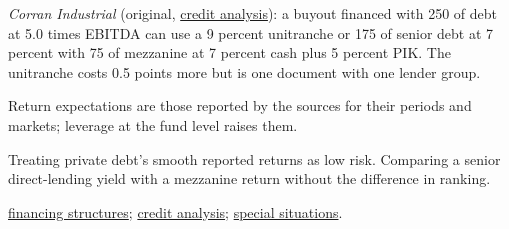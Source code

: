 \begin{qfdefinition}
 \emph{Corran Industrial} (original, \hyperref[meth:private-debt-credit-analysis]{credit analysis}): a buyout financed with 250 of debt at 5.0 times EBITDA can use a 9 percent unitranche or 175 of senior debt at 7 percent with 75 of mezzanine at 7 percent cash plus 5 percent PIK. The unitranche costs 0.5 points more but is one document with one lender group.

 Return expectations are those reported by the sources for their periods and markets; leverage at the fund level raises them.

 Treating private debt's smooth reported returns as low risk. Comparing a senior direct-lending yield with a mezzanine return without the difference in ranking.

 \hyperref[meth:private-debt-financing-structures]{financing structures}; \hyperref[meth:private-debt-credit-analysis]{credit analysis}; \hyperref[meth:special-situations-distressed]{special situations}.

\end{qfdefinition}

